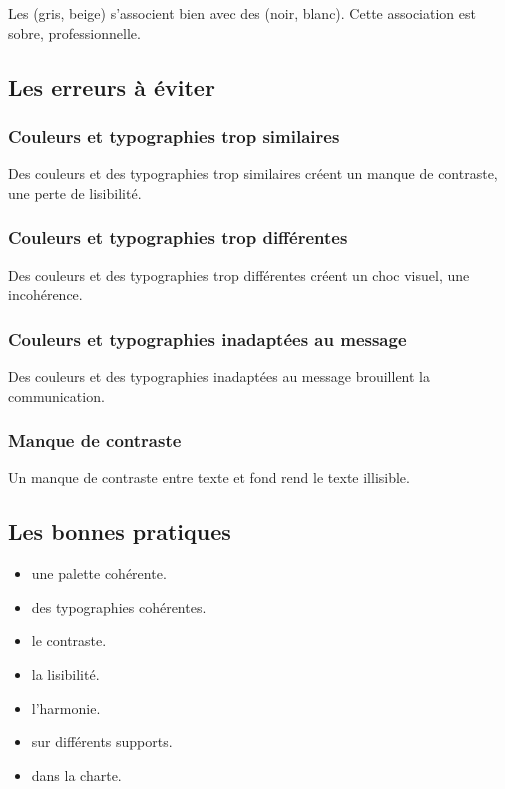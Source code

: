 Les  (gris, beige) s'associent bien avec des  (noir, blanc). Cette association est sobre, professionnelle.

\subsection{Les erreurs à éviter}

\subsubsection{Couleurs et typographies trop similaires}

Des couleurs et des typographies trop similaires créent un manque de contraste, une perte de lisibilité.

\subsubsection{Couleurs et typographies trop différentes}

Des couleurs et des typographies trop différentes créent un choc visuel, une incohérence.

\subsubsection{Couleurs et typographies inadaptées au message}

Des couleurs et des typographies inadaptées au message brouillent la communication.

\subsubsection{Manque de contraste}

Un manque de contraste entre texte et fond rend le texte illisible.

\subsection{Les bonnes pratiques}

\begin{itemize}
    \item {} une palette cohérente.
    \item {} des typographies cohérentes.
    \item {} le contraste.
    \item {} la lisibilité.
    \item {} l'harmonie.
    \item {} sur différents supports.
    \item {} dans la charte.
\end{itemize}

